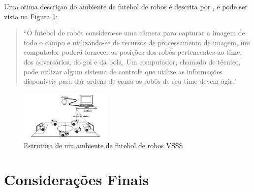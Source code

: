 Uma otima descriçao do ambiente de futebol de robos é descrita por \cite{Faria2006}, e pode ser vista na Figura \ref{VSSS}:
\begin{quotation}
``O futebol de robôs considera-se uma câmera para capturar
a imagem de todo o campo e utilizando-se de recursos de processamento de imagem, um
computador poderá fornecer as posições dos robôs pertencentes ao time, dos adversários,
do gol e da bola. Um computador, chamado de técnico, pode utilizar algum sistema de
controle que utilize as informações disponíveis para dar ordens de como os robôs de seu
time devem agir."
\end{quotation}
 \begin{figure}[H]
	\centering
	\includegraphics[width=0.4\textwidth]{faria2006.png}
	\caption{Estrutura de um ambiente de futebol de robos VSSS\cite{Faria2006}}
	\label{VSSS}
\end{figure} 
\section{Considerações Finais}